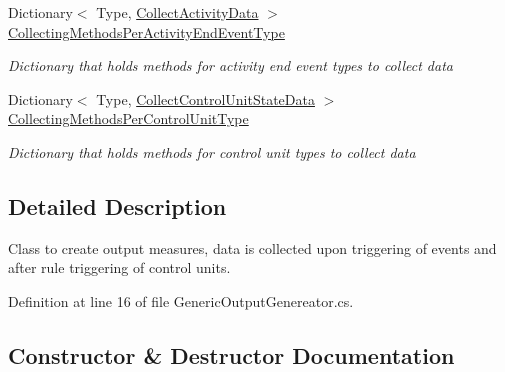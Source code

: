 \begin{DoxyCompactItemize}
Dictionary$<$ Type, \hyperlink{class_simulation_core_1_1_model_log_1_1_generic_output_genereator_a0270699b86c929ca3021962550625514}{Collect\+Activity\+Data} $>$ \hyperlink{class_simulation_core_1_1_model_log_1_1_generic_output_genereator_ab16081627424a7d2473c64cf2d7e96ed}{Collecting\+Methods\+Per\+Activity\+End\+Event\+Type}
\begin{DoxyCompactList}\small\item\em Dictionary that holds methods for activity end event types to collect data \end{DoxyCompactList}\item 
Dictionary$<$ Type, \hyperlink{class_simulation_core_1_1_model_log_1_1_generic_output_genereator_a41bcb68889385d00be690756a3d60b80}{Collect\+Control\+Unit\+State\+Data} $>$ \hyperlink{class_simulation_core_1_1_model_log_1_1_generic_output_genereator_ab6472739b209892ee71617fcb4631753}{Collecting\+Methods\+Per\+Control\+Unit\+Type}
\begin{DoxyCompactList}\small\item\em Dictionary that holds methods for control unit types to collect data \end{DoxyCompactList}\end{DoxyCompactItemize}


\subsection{Detailed Description}
Class to create output measures, data is collected upon triggering of events and after rule triggering of control units. 



Definition at line 16 of file Generic\+Output\+Genereator.\+cs.



\subsection{Constructor \& Destructor Documentation}
